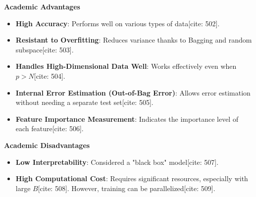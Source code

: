 \documentclass[12pt]{report}
\begin{document}
{{{\textbf*{Academic Advantages}
\begin{itemize}
    \item \textbf{High Accuracy}: Performs well on various types of data[cite: 502].
    \item \textbf{Resistant to Overfitting}: Reduces variance thanks to Bagging and random subspace[cite: 503].
    \item \textbf{Handles High-Dimensional Data Well}: Works effectively even when $p > N$[cite: 504].
    \item \textbf{Internal Error Estimation (Out-of-Bag Error)}: Allows error estimation without needing a separate test set[cite: 505].
    \item \textbf{Feature Importance Measurement}: Indicates the importance level of each feature[cite: 506].
\end{itemize}

\textbf*{Academic Disadvantages}
\begin{itemize}
    \item \textbf{Low Interpretability}: Considered a "black box" model[cite: 507].
    \item \textbf{High Computational Cost}: Requires significant resources, especially with large $B$[cite: 508]. However, training can be parallelized[cite: 509].
\end{itemize}

}}}
\end{document}
